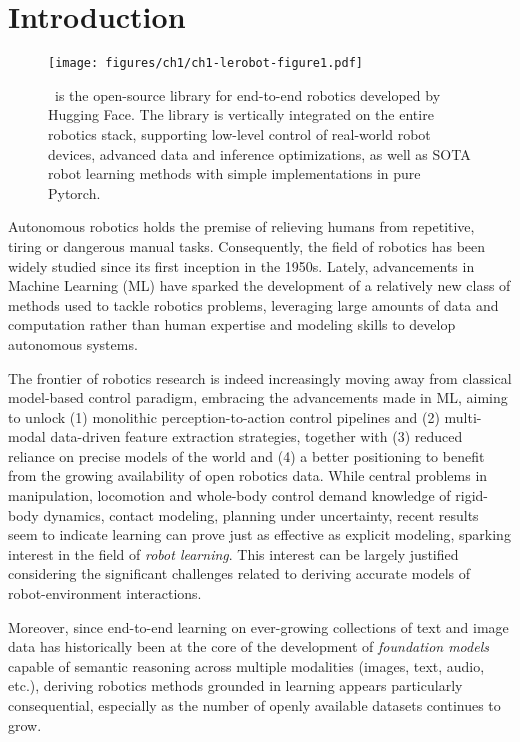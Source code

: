 \section{Introduction}

\begin{figure}
    \centering
    \texttt{[image: figures/ch1/ch1-lerobot-figure1.pdf]}
    \caption{\lerobot~is the open-source library for end-to-end robotics developed by Hugging Face. The library is vertically integrated on the entire robotics stack, supporting low-level control of real-world robot devices, advanced data and inference optimizations, as well as  SOTA robot learning methods with simple implementations in pure Pytorch.}
    \label{fig:figure1}
\end{figure}

Autonomous robotics holds the premise of relieving humans from repetitive, tiring or dangerous manual tasks.
Consequently, the field of robotics has been widely studied since its first inception in the 1950s.
Lately, advancements in Machine Learning (ML) have sparked the development of a relatively new class of methods used to tackle robotics problems, leveraging large amounts of data and computation rather than human expertise and modeling skills to develop autonomous systems.

The frontier of robotics research is indeed increasingly moving away from classical model-based control paradigm, embracing the advancements made in ML, aiming to unlock (1) monolithic perception-to-action control pipelines and (2) multi-modal data-driven feature extraction strategies, together with (3) reduced reliance on precise models of the world and (4) a better positioning to benefit from the growing availability of open robotics data.
While central problems in manipulation, locomotion and whole-body control demand knowledge of rigid-body dynamics, contact modeling, planning under uncertainty, recent results seem to indicate learning can prove just as effective as explicit modeling, sparking interest in the field of \emph{robot learning}.
This interest can be largely justified considering the significant challenges related to deriving accurate models of robot-environment interactions.

Moreover, since end-to-end learning on ever-growing collections of text and image data has historically been at the core of the development of \emph{foundation models} capable of semantic reasoning across multiple modalities (images, text, audio, etc.), deriving robotics methods grounded in learning appears particularly consequential, especially as the number of openly available datasets continues to grow.

